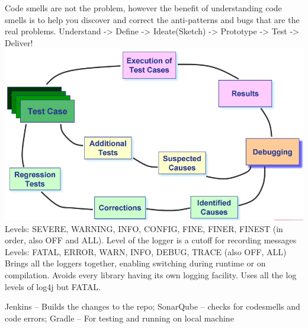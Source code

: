 \documentclass[number]{assignment}
\begin{document}
\begin{landscape}
\begin{multicols}{3}
Code smells are not the problem, however the benefit of understanding code smells is to help you discover and correct the anti-patterns and bugs that are the real problems.
Understand -> Define -> Ideate(Sketch) -> Prototype -> Test -> Deliver!
\includegraphics[width=\linewidth]{DebugProcess.png}
Levels: SEVERE, WARNING, INFO, CONFIG, FINE, FINER, FINEST (in order, also OFF and ALL). Level of the logger is a cutoff for recording messages
Levels: FATAL, ERROR, WARN, INFO, DEBUG, TRACE (also OFF, ALL)
Brings all the loggers together, enabling switching during runtime or on compilation. Avoids every library having its own logging facility. Uses all the log levels of log4j but FATAL.

Jenkins -- Builds the changes to the repo; SonarQube -- checks for codesmells and code errors; Gradle -- For testing and running on local machine\\

\end{multicols}
\end{landscape}
\end{document}

